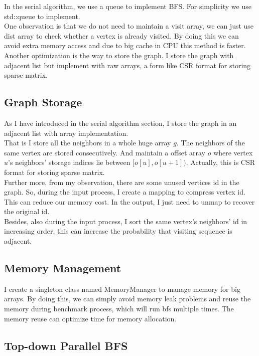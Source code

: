 \documentclass[10pt,twocolumn,letterpaper]{article}
\begin{document}
In the serial algorithm, we use a queue to implement BFS. For simplicity we use std::queue to implement.\\
One observation is that we do not need to maintain a visit array, we can just use dist array to check whether a vertex is already visited. By doing this we can avoid extra memory access and due to big cache in CPU this method is faster.\\
Another optimization is the way to store the graph. I store the graph with adjacent list but implement with raw arrays, a form like CSR format for storing sparse matrix.

\subsection{Graph Storage}

As I have introduced in the serial algorithm section, I store the graph in an adjacent list with array implementation.\\
That is I store all the neighbors in a whole huge array $g$. The neighbors of the same vertex are stored consecutively. And maintain a offset array $o$ where vertex $u$'s neighbors' storage indices lie between $[o[u], o[u + 1])$. Actually, this is CSR format for storing sparse matrix.\\
Further more, from my observation, there are some unused vertices id in the graph. So, during the input process, I create a mapping to compress vertex id. This can reduce our memory cost. In the output, I just need to unmap to recover the original id.\\
Besides, also during the input process, I sort the same vertex's neighbors' id in increasing order, this can increase the probability that visiting sequence is adjacent.

\subsection{Memory Management}

I create a singleton class named MemoryManager to manage memory for big arrays. By doing this, we can simply avoid memory leak problems and reuse the memory during benchmark process, which will run bfs multiple times. The memory reuse can optimize time for memory allocation.

\subsection{Top-down Parallel BFS}
\end{document}
